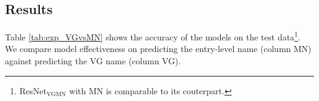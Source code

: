 \subsection{Results}
\label{sect:exp_results}

Table \ref{tab:exp_VGvsMN} shows the accuracy of the models on the \mn test data\footnote{ResNet$_{\text{VGMN}}$ with MN is comparable to its couterpart.}. 
We compare model effectiveness on predicting the entry-level name (column MN) against predicting the VG name (column VG). 

